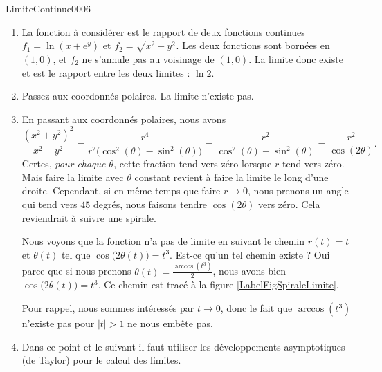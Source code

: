 \begin{corrige}{LimiteContinue0006}

  \begin{enumerate}
  \item La fonction à considérer est le rapport de deux fonctions continues $f_1=\ln (x+e^y)$ et  $f_2=\sqrt{x^2+y^2}$. Les deux fonctions sont bornées en $(1,0)$, et $f_2$ ne s'annule pas au voisinage de $(1,0)$. La limite donc existe et est le rapport entre les deux limites : $\ln 2 $.
    \item Passez aux coordonnés polaires. La limite n'existe pas. 

      \item 
		En passant aux coordonnés polaires, nous avons
		\begin{equation}
			\frac{ (x^2+y^2)^2 }{ x^2-y^2 }=\frac{ r^4 }{ r^2\big( \cos^2(\theta)-\sin^2(\theta) \big) }=\frac{ r^2 }{ \cos^2(\theta)-\sin^2(\theta) }=\frac{ r^2 }{ \cos(2\theta) }.
		\end{equation}
		Certes, \emph{pour chaque $\theta$}, cette fraction tend vers zéro lorsque $r$ tend vers zéro. Mais faire la limite avec $\theta$ constant revient à faire la limite le long d'une droite. Cependant, si en même temps que faire $r\to 0$, nous prenons un angle qui tend vers $45$ degrés, nous faisons tendre $\cos(2\theta)$ vers zéro. Cela reviendrait à suivre une spirale.

		Nous voyons que la fonction n'a pas de limite en suivant le chemin $r(t)=t$ et $\theta(t)$ tel que $\cos\big( 2\theta(t) \big)=t^3$. Est-ce qu'un tel chemin existe ? Oui parce que si nous prenons $\theta(t)=\frac{ \arccos(t^3) }{2}$, nous avons bien $\cos\big( 2\theta(t) \big)=t^3$. Ce chemin est tracé à la figure \ref{LabelFigSpiraleLimite}.
\newcommand{\CaptionFigSpiraleLimite}{Un chemin possible le long duquel calculer une limite. $r(t)=t$, $\theta(t)=\arccos(t^3)/2$.}


		
		Pour rappel, nous sommes intéressés par $t\to 0$, donc le fait que $\arccos(t^3)$ n'existe pas pour $| t |>1$ ne nous embête pas.

        \item Dans ce point et le suivant il faut utiliser les développements asymptotiques (de Taylor) pour le calcul des limites.
          

\end{enumerate}
\end{corrige}
